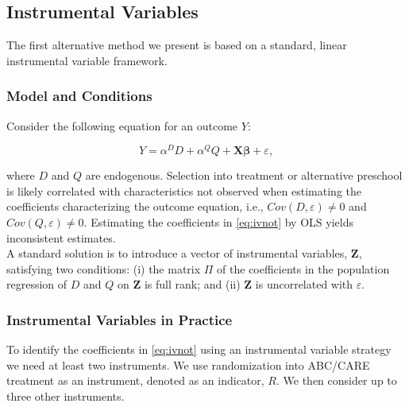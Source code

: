 \subsection{Instrumental Variables}

\noindent The first alternative method we present is based on a standard, linear instrumental variable framework.

\subsubsection{Model and Conditions}

\noindent Consider the following equation for an outcome $Y$:

\begin{equation}
Y = \alpha^D D + \alpha^Q Q + \mathbf{X} \bm{\beta} + \varepsilon,
\label{eq:ivnot}
\end{equation}

\noindent where $D$ and $Q$ are endogenous. Selection into treatment or alternative preschool is likely correlated with characteristics not observed when estimating the coefficients characterizing the outcome equation, i.e., $Cov(D,\varepsilon) \neq 0$ and $Cov(Q,\varepsilon) \neq 0$. Estimating the coefficients in \eqref{eq:ivnot} by OLS yields inconsistent estimates.\\

\noindent A standard solution is to introduce a vector of instrumental variables, $\mathbf{Z}$, satisfying two conditions: (i) the matrix $\Pi$ of the coefficients in the population regression of $D$ and $Q$ on $\mathbf{Z}$ is full rank; and (ii) $\mathbf{Z}$ is uncorrelated with $\varepsilon$.


\subsubsection{Instrumental Variables in Practice}

\noindent To identify the coefficients in \eqref{eq:ivnot} using an instrumental variable strategy we need at least two instruments. We use randomization into ABC/CARE treatment as an instrument, denoted as an indicator, $R$. We then consider up to three other instruments.

